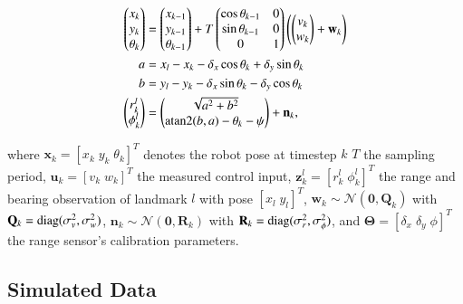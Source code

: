 \begin{equation}\label{eqn:exp_model}
  \begin{aligned}
  \begin{pmatrix}
  x_k\\
  y_k\\
  \theta_k
  \end{pmatrix} &=
  \begin{pmatrix}
  x_{k-1}\\
  y_{k-1}\\
  \theta_{k-1}
  \end{pmatrix} + T
  \begin{pmatrix}
  \cos\theta_{k-1}&0\\
  \sin\theta_{k-1}&0\\
  0&1
  \end{pmatrix}
  \left(\begin{pmatrix}
  v_k\\
  w_k
  \end{pmatrix}
  + \mathbf{w}_k\right)\\
  a &= x_l - x_k - \delta_x\cos\theta_k + \delta_y\sin\theta_k\\
  b &= y_l - y_k - \delta_x\sin\theta_k - \delta_y\cos\theta_k\\
  \begin{pmatrix}
  r_k^l\\
  \phi_k^l
  \end{pmatrix} &=
  \begin{pmatrix}
  \sqrt{a^2 + b^2}\\
  \atan2(b, a) - \theta_k - \psi
  \end{pmatrix}
  + \mathbf{n}_k,
  \end{aligned}
\end{equation}

\noindent where $\mathbf{x}_k=[x_k\;y_k\;\theta_k]^T$ denotes the robot pose at
timestep $k$ $T$ the sampling period, $\mathbf{u}_k=[v_k\;w_k]^T$ the measured
control input, $\mathbf{z}_k^l=[r_k^l\;\phi_k^l]^T$ the range and bearing
observation of landmark $l$ with pose $[x_l\;y_l]^T$, $\mathbf{w}_k
\sim\mathcal{N}(\mathbf{0}, \mathbf{Q}_k)$ with $\mathbf{Q}_k=\operatorname{diag}(\sigma^2_v,
\sigma^2_w)$, $\mathbf{n}_k\sim\mathcal{N}(\mathbf{0}, \mathbf{R}_k)$ with
$\mathbf{R}_k=\operatorname{diag}(\sigma^2_r, \sigma^2_\phi)$, and
$\mathbf{\Theta}=[\delta_x\;\delta_y\;\phi]^T$ the range sensor's calibration
parameters.

\subsection{Simulated Data}

